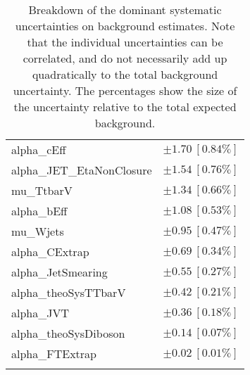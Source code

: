 \begin{table}
\begin{center}
\begin{tabular*}{\textwidth}{@{\extracolsep{\fill}}lc}
alpha\_cEff         & $\pm 1.70\ [0.84\%] $       \\
alpha\_JET\_EtaNonClosure         & $\pm 1.54\ [0.76\%] $       \\
mu\_TtbarV         & $\pm 1.34\ [0.66\%] $       \\
alpha\_bEff         & $\pm 1.08\ [0.53\%] $       \\
mu\_Wjets         & $\pm 0.95\ [0.47\%] $       \\
alpha\_CExtrap         & $\pm 0.69\ [0.34\%] $       \\
alpha\_JetSmearing         & $\pm 0.55\ [0.27\%] $       \\
alpha\_theoSysTTbarV         & $\pm 0.42\ [0.21\%] $       \\
alpha\_JVT         & $\pm 0.36\ [0.18\%] $       \\
alpha\_theoSysDiboson         & $\pm 0.14\ [0.07\%] $       \\
alpha\_FTExtrap         & $\pm 0.02\ [0.01\%] $       \\
\noalign{\smallskip}\hline\noalign{\smallskip}
\end{tabular*}
\end{center}
\caption[Breakdown of uncertainty on background estimates]{
Breakdown of the dominant systematic uncertainties on background estimates.
Note that the individual uncertainties can be correlated, and do not necessarily add up quadratically to 
the total background uncertainty. The percentages show the size of the uncertainty relative to the total expected background.
\label{table.results.bkgestimate.uncertainties.VRTopBT0}}
\end{table}
%